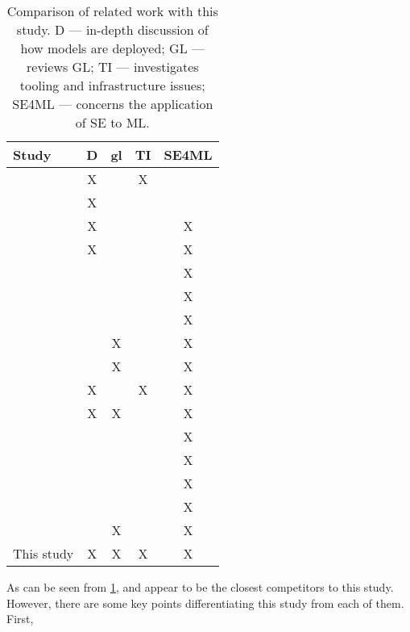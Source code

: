 \begin{table}[h]
    \centering
    \begin{tabular}{l c c c c}
        Study & D & \acrshort{gl} & TI & SE4ML \\
        \hline
        \cite{Shahin2017} & X & & X & \\
        \cite{Rodriguez2017} & X & & & \\
        \cite{Baier2019} & X & & & X \\
        \cite{Paleyes2020} & X & & & X \\
        \cite{Kumeno2020} & & & & X \\
        \cite{Nascimento2020} & & & & X \\
        \cite{Lwakatare2020} & & & & X \\
        \cite{Lwakatare2020a} & & X & & X \\
        \cite{Serban2020} & & X & & X \\
        \cite{Karamitsos2020} & X & & X & X \\
        \cite{John2021} & X & X & & X \\
        \cite{Giray2021} & & & & X \\
        \cite{Lorenzoni2021} & & & & X \\
        \cite{MartinezFernandez2021} & & & & X \\
        \cite{Serban2021} & & & & X \\
        \cite{John2021a} & & X & & X \\
        This study & X & X & X & X \\
    \end{tabular}
    \caption{Comparison of related work with this study. D --- in-depth discussion of how models are deployed; GL --- reviews GL; TI --- investigates tooling and infrastructure issues; SE4ML --- concerns the application of SE to ML.}
    \label{tab:related_work_comparison}
\end{table}

As can be seen from \cref{tab:related_work_comparison}, \cite{Karamitsos2020} and \cite{John2021} appear to be the closest competitors to this study.
However, there are some key points differentiating this study from each of them.
First, \cite{John2021} 

